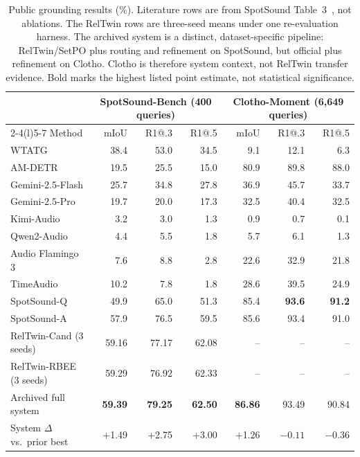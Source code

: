 \begin{table}[t]
\centering
\caption{Public grounding results (\%). Literature rows are from SpotSound Table~3~\cite{sun2026spotsound}, not ablations. The RelTwin rows are three-seed means under one re-evaluation harness. The archived system is a distinct, dataset-specific pipeline: RelTwin/SetPO plus routing and refinement on SpotSound, but official plus refinement on Clotho. Clotho is therefore system context, not RelTwin transfer evidence. Bold marks the highest listed point estimate, not statistical significance.}
\label{tab:main}
\small
\setlength{\tabcolsep}{7pt}
\begin{tabular}{@{}lrrrrrr@{}}
\toprule
 & \multicolumn{3}{c}{SpotSound-Bench (400 queries)} & \multicolumn{3}{c}{Clotho-Moment (6,649 queries)}\\
\cmidrule(lr){2-4}\cmidrule(l){5-7}
Method & mIoU & R1@.3 & R1@.5 & mIoU & R1@.3 & R1@.5\\
\midrule
WTATG & 38.4 & 53.0 & 34.5 & 9.1 & 12.1 & 6.3\\
AM-DETR & 19.5 & 25.5 & 15.0 & 80.9 & 89.8 & 88.0\\
Gemini-2.5-Flash & 25.7 & 34.8 & 27.8 & 36.9 & 45.7 & 33.7\\
Gemini-2.5-Pro & 19.7 & 20.0 & 17.3 & 32.5 & 40.4 & 32.5\\
Kimi-Audio & 3.2 & 3.0 & 1.3 & 0.9 & 0.7 & 0.1\\
Qwen2-Audio & 4.4 & 5.5 & 1.8 & 5.7 & 6.1 & 1.3\\
Audio Flamingo 3 & 7.6 & 8.8 & 2.8 & 22.6 & 32.9 & 21.8\\
TimeAudio & 10.2 & 7.8 & 1.8 & 28.6 & 39.5 & 24.9\\
SpotSound-Q & 49.9 & 65.0 & 51.3 & 85.4 & \textbf{93.6} & \textbf{91.2}\\
SpotSound-A & 57.9 & 76.5 & 59.5 & 85.6 & 93.4 & 91.0\\
\midrule
RelTwin-Cand (3 seeds) & 59.16 & 77.17 & 62.08 & -- & -- & --\\
RelTwin-RBEE (3 seeds) & 59.29 & 76.92 & 62.33 & -- & -- & --\\
Archived full system & \textbf{59.39} & \textbf{79.25} & \textbf{62.50} & \textbf{86.86} & 93.49 & 90.84\\
System $\Delta$ vs.\ prior best & +1.49 & +2.75 & +3.00 & +1.26 & $-0.11$ & $-0.36$\\
\bottomrule
\end{tabular}
\end{table}
